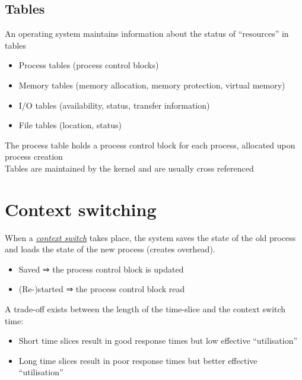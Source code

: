 \documentclass{article}
\newcommand{\worddef}[1]{\hyperref[sec:reference]{\textit{#1}}}
\begin{document}
\subsection{Tables}
\begin{flushleft}
An operating system maintains information about the status of “resources” in tables
\begin{itemize}
	\item Process tables (process control blocks)
	\item Memory tables (memory allocation, memory protection, virtual memory) 
	\item I/O tables (availability, status, transfer information)
	\item File tables (location, status)
\end{itemize}
The process table holds a process control block for each process, allocated upon process creation\\
Tables are maintained by the kernel and are usually cross referenced
\end{flushleft}

\section{Context switching}
\begin{flushleft}
When a \worddef{context switch} takes place, the system saves the state of the old process and loads the state of the new process (creates overhead).
\begin{itemize}
	\item Saved ⇒ the process control block is updated 
	\item (Re-)started ⇒ the process control block read
\end{itemize}
A trade-off exists between the length of the time-slice and the context switch time:
\begin{itemize}
	\item Short time slices result in good response times but low effective “utilisation”
	\item Long time slices result in poor response times but better effective “utilisation”
\end{itemize}
\end{flushleft}

\pagebreak
\end{document}
